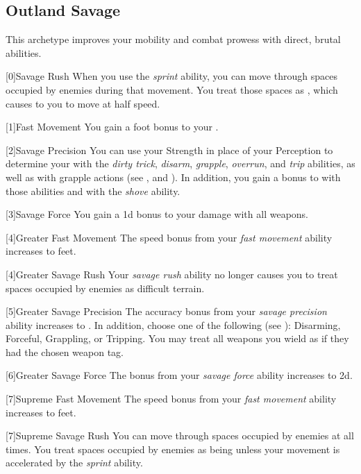     \newpage
    \subsection{Outland Savage}
        This archetype improves your mobility and combat prowess with direct, brutal abilities.

        [0]{Savage Rush} When you use the \textit{sprint} ability, you can move through spaces occupied by enemies during that movement.
        You treat those spaces as , which causes to you to move at half speed.

        [1]{Fast Movement} You gain a  foot bonus to your .

        [2]{Savage Precision} You can use your Strength in place of your Perception to determine your  with the \textit{dirty trick}, \textit{disarm}, \textit{grapple}, \textit{overrun}, and \textit{trip} abilities, as well as with grapple actions (see , and ).
        In addition, you gain a  bonus to  with those abilities and with the \textit{shove} ability.

        [3]{Savage Force} You gain a \plus1d bonus to your damage with all weapons.

        [4]{Greater Fast Movement} The speed bonus from your \textit{fast movement} ability increases to  feet.

        [4]{Greater Savage Rush} Your \textit{savage rush} ability no longer causes you to treat spaces occupied by enemies as difficult terrain.

        [5]{Greater Savage Precision} The accuracy bonus from your \textit{savage precision} ability increases to .
        In addition, choose one of the following  (see ): Disarming, Forceful, Grappling, or Tripping.
        You may treat all weapons you wield as if they had the chosen weapon tag.

        [6]{Greater Savage Force} The bonus from your \textit{savage force} ability increases to \plus2d.

        [7]{Supreme Fast Movement} The speed bonus from your \textit{fast movement} ability increases to  feet.

        [7]{Supreme Savage Rush} You can move through spaces occupied by enemies at all times.
        You treat spaces occupied by enemies as being  unless your movement is accelerated by the \textit{sprint} ability.


